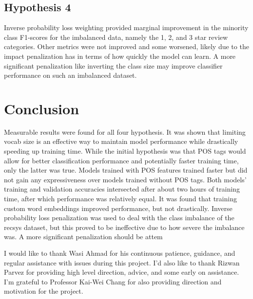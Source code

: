 \subsection{Hypothesis 4}
Inverse probability loss weighting provided marginal improvement in the minority class F1-scores for the imbalanced data, namely the 1, 2, and 3 star review categories. Other metrics were not improved and some worsened, likely due to the impact penalization has in terms of how quickly the model can learn. A more significant penalization like inverting the class size may improve classifier performance on such an imbalanced dataset.

\section{Conclusion}
Measurable results were found for all four hypothesis. It was shown that limiting vocab size is an effective way to maintain model performance while drastically speeding up training time. While the initial hypothesis was that POS tags would allow for better classification performance and potentially faster training time, only the latter was true. Models trained with POS features trained faster but did not gain any expressiveness over models trained without POS tags. Both models' training and validation accuracies intersected after about two hours of training time, after which performance was relatively equal. It was found that training custom word embeddings improved performance, but not drastically. Inverse probability loss penalization was used to deal with the class imbalance of the recsys dataset, but this proved to be ineffective due to how severe the imbalance was. A more significant penalization should be attem 

\begin{acks}
I would like to thank Wasi Ahmad for his continuous patience, guidance, and regular assistance with issues during this project. I'd also like to thank Rizwan Parvez for providing high level direction, advice, and some early on assistance. I'm grateful to Professor Kai-Wei Chang for also providing direction and motivation for the project.

\end{acks}






